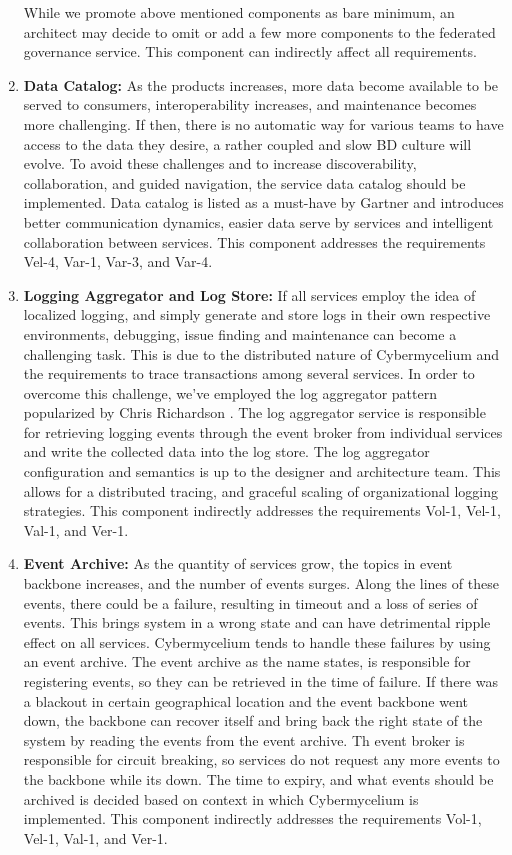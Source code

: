 \documentclass{bmcart}
\begin{document}
\begin{enumerate}
    While we promote above mentioned components as bare minimum, an architect may decide to omit or add a few more components to the federated governance service. This component can indirectly affect all requirements.

    \item \textbf{Data Catalog:} As the products increases, more data become available to be served to consumers, interoperability increases, and maintenance becomes more challenging. If then, there is no automatic way for various teams to have access to the data they desire, a rather coupled and slow BD culture will evolve. To avoid these challenges and to increase discoverability, collaboration, and guided navigation, the service data catalog should be implemented. Data catalog is listed as a must-have by Gartner \cite{GartnerDataCatalog} and introduces better communication dynamics, easier data serve by services and intelligent collaboration between services. This component addresses the requirements Vel-4, Var-1, Var-3, and Var-4.
    
    \item \textbf{Logging Aggregator and Log Store:} If all services employ the idea of localized logging, and simply generate and store logs in their own respective environments, debugging, issue finding and maintenance can become a challenging task. This is due to the distributed nature of Cybermycelium and the requirements to trace transactions among several services. In order to overcome this challenge, we've employed the log aggregator pattern popularized by Chris Richardson \cite{MicroServicesPatterns}. The log aggregator service is responsible for retrieving logging events through the event broker from individual services and write the collected data into the log store. The log aggregator configuration and semantics is up to the designer and architecture team. This allows for a distributed tracing, and graceful scaling of organizational logging strategies. This component indirectly addresses the requirements Vol-1, Vel-1, Val-1, and Ver-1.

    \item \textbf{Event Archive:} As the quantity of services grow, the topics in event backbone increases, and the number of events surges. Along the lines of these events, there could be a failure, resulting in timeout and a loss of series of events. This brings system in a wrong state and can have detrimental ripple effect on all services. Cybermycelium tends to handle these failures by using an event archive. The event archive as the name states, is responsible for registering events, so they can be retrieved in the time of failure. If there was a blackout in certain geographical location and the event backbone went down, the backbone can recover itself and bring back the right state of the system by reading the events from the event archive. Th event broker is responsible for circuit breaking, so services do not request any more events to the backbone while its down. The time to expiry, and what events should be archived is decided based on context in which Cybermycelium is implemented. This component indirectly addresses
    the requirements Vol-1, Vel-1, Val-1, and Ver-1.


\end{enumerate}
\end{document}
